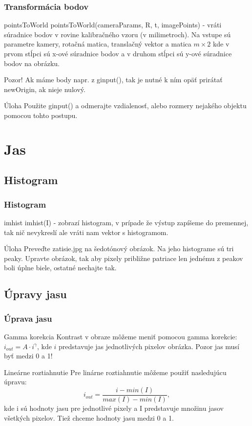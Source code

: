 \documentclass{beamer}
\begin{document}
\begin{frame}
\frametitle{Transformácia bodov}
\begin{block}{pointsToWorld}
pointsToWorld(cameraParams, R, t, imagePoints) - vráti súradnice bodov v rovine kalibračného vzoru (v milimetroch). Na vstupe sú parametre kamery, rotačná matica, translačný vektor a matica $m \times 2$ kde v prvom stĺpci sú x-ové súradnice bodov a v druhom stĺpci sú y-ové súradnice bodov na obrázku. 
\end{block}

\begin{alertblock}{Pozor!}
Ak máme body napr. z ginput(), tak je nutné k ním opäť prirátať newOrigin, ak nieje nulový.
\end{alertblock}

\begin{block}{Úloha}
Použite ginput() a odmerajte vzdialenosť, alebo rozmery nejakého objektu pomocou tohto postupu.
\end{block}
\end{frame}

\section{Jas}
\subsection{Histogram}
\begin{frame}
\frametitle{Histogram}
\begin{block}{imhist}
imhist(I) - zobrazí histogram, v prípade že výstup zapíšeme do premennej, tak nič nevykreslí ale vráti nam vektor s histogramom.
\end{block}

\begin{block}{Úloha}
Preveďte zatisie.jpg na šedotónový obrázok. Na jeho histograme sú tri peaky. Upravte obrázok, tak aby pixely približne patriace len jednému z peakov boli úplne biele, ostatné nechajte tak.
\end{block}
\end{frame}

\subsection{Úpravy jasu}
\begin{frame}
\frametitle{Úprava jasu}
\begin{block}{Gamma korekcia}
Kontrast v obraze môžeme meniť pomocou gamma korekcie: $i_{out} = A \cdot i^{\gamma}$, kde $i$ predstavuje jas jednotlivých pixelov obrázka. Pozor jas musí byť medzi 0 a 1!
\end{block}

\begin{block}{Lineárne roztiahnutie}
Pre linárne roztiahnutie môžeme použiť nasledujúcu úpravu:
\begin{equation*}
i_{out} = \frac{i - min(I)}{max(I) - min(I)},\end{equation*}
kde i sú hodnoty jasu pre jednotlivé pixely a I predstavuje množinu jasov všetkých pixelov. Tiež chceme hodnoty jasu medzi 0 a 1.
\end{block}
\end{frame}
\end{document}
